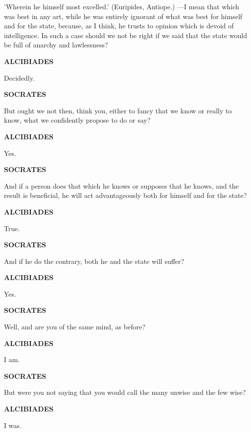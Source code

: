 \documentclass[11pt,letter]{article}
\begin{document}
\par  'Wherein he himself most excelled.' (Euripides, Antiope.) —I mean that which was best in any art, while he was entirely ignorant of what was best for himself and for the state, because, as I think, he trusts to opinion which is devoid of intelligence. In such a case should we not be right if we said that the state would be full of anarchy and lawlessness?

\par \textbf{ALCIBIADES}
\par   Decidedly.

\par \textbf{SOCRATES}
\par   But ought we not then, think you, either to fancy that we know or really to know, what we confidently propose to do or say?

\par \textbf{ALCIBIADES}
\par   Yes.

\par \textbf{SOCRATES}
\par   And if a person does that which he knows or supposes that he knows, and the result is beneficial, he will act advantageously both for himself and for the state?

\par \textbf{ALCIBIADES}
\par   True.

\par \textbf{SOCRATES}
\par   And if he do the contrary, both he and the state will suffer?

\par \textbf{ALCIBIADES}
\par   Yes.

\par \textbf{SOCRATES}
\par   Well, and are you of the same mind, as before?

\par \textbf{ALCIBIADES}
\par   I am.

\par \textbf{SOCRATES}
\par   But were you not saying that you would call the many unwise and the few wise?

\par \textbf{ALCIBIADES}
\par   I was.
\end{document}
